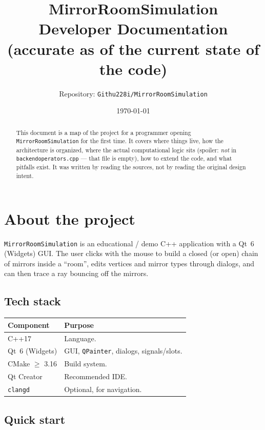 \documentclass[a4paper,11pt]{article}
\title{\textbf{MirrorRoomSimulation}\\[0.3em]
       \large Developer Documentation\\[0.2em]
       \normalsize (accurate as of the current state of the code)}
\author{Repository: \texttt{Githu228i/MirrorRoomSimulation}}
\date{\today}
\newcommand{\file}[1]{\texttt{#1}}
\newcommand{\code}[1]{\texttt{#1}}
\begin{document}
\maketitle

\begin{abstract}
\noindent
This document is a map of the project for a programmer opening
\file{MirrorRoomSimulation} for the first time. It covers where things
live, how the architecture is organized, where the actual computational
logic sits (spoiler: \emph{not} in \file{backendoperators.cpp} — that
file is empty), how to extend the code, and what pitfalls exist. It was
written by reading the sources, not by reading the original design
intent.
\end{abstract}

\tableofcontents
\newpage

\section{About the project}

\file{MirrorRoomSimulation} is an educational / demo C++ application
with a Qt~6 (Widgets) GUI. The user clicks with the mouse to build a
closed (or open) chain of mirrors inside a ``room'', edits vertices and
mirror types through dialogs, and can then trace a ray bouncing off
the mirrors.

\subsection{Tech stack}

\begin{longtable}{@{}p{4cm}p{10.5cm}@{}}
\toprule
\textbf{Component} & \textbf{Purpose} \\ \midrule
\endhead
C++17 & Language. \\
Qt~6 (Widgets) & GUI, \code{QPainter}, dialogs, signals/slots. \\
CMake $\geq$ 3.16 & Build system. \\
Qt Creator & Recommended IDE. \\
\code{clangd} & Optional, for navigation. \\
\bottomrule
\end{longtable}

\subsection{Quick start}
\end{document}
